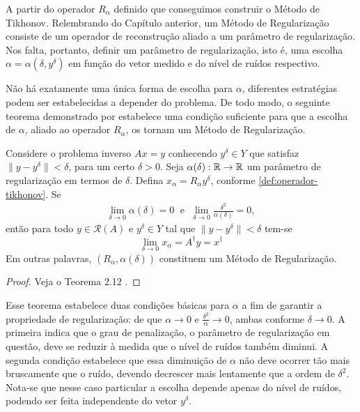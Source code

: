 A partir do operador $R_\alpha$ definido que conseguimos construir o Método de Tikhonov. Relembrando do Capítulo anterior, um Método de Regularização consiste de um operador de reconstrução aliado a um parâmetro de regularização. Nos falta, portanto, definir um parâmetro de regularização, isto é, uma escolha $\alpha = \alpha(\delta,y^\delta)$ em função do vetor medido e do nível de ruídos respectivo. 

Não há exatamente uma única forma de escolha para $\alpha$, diferentes estratégias podem ser estabelecidas a depender do problema. De todo modo, o seguinte teorema demonstrado por  estabelece uma condição suficiente para que a escolha de $\alpha$, aliado ao operador $R_\alpha$, os tornam um Método de Regularização. 

\begin{teo}
    Considere o problema inverso $Ax=y$ conhecendo $y^\delta \in Y$ que satisfaz $\|y-y^\delta\| < \delta$, para um certo $\delta > 0$. Seja $\alpha(\delta): \mathbb{R} \to \mathbb{R}$ um parâmetro de regularização em termos de $\delta$. Defina $x_\alpha = R_\alpha y^\delta$, conforme \ref{def:operador-tikhonov}.
    Se 
    \begin{align*}
    \lim_{\delta \to 0} \alpha(\delta) = 0  \; \text{ e } \;
    \lim_{\delta \to 0} \frac{\delta^2}{\alpha(\delta)} = 0,
    \end{align*}
    então para todo $y\in \mathcal R(A)$ e $y^\delta \in Y$ tal que $\|y-y^\delta\| < \delta$ tem-se
    \begin{equation*}
        \lim_{\delta \to 0} x_\alpha = A^\dag y = x^\dag
    \end{equation*}
    Em outras palavras, $(R_\alpha, \alpha(\delta))$ constituem um Método de Regularização.
\end{teo}
\begin{proof}
Veja o Teorema 2.12 \cite{kirsch}.
\end{proof}

Esse teorema estabelece duas condições básicas para $\alpha$ a fim de garantir a propriedade de regularização: de que $\alpha \to 0$ e $\frac{\delta^2}{\alpha} \to 0$, ambas conforme $\delta \to 0$. A primeira indica que o grau de penalização, o parâmetro de regularização em questão, deve se reduzir à medida que o nível de ruídos também diminui. A segunda condição estabelece que essa diminuição de $\alpha$ não deve ocorrer tão mais bruscamente que o ruído, devendo decrescer mais lentamente que a ordem de $\delta^2$. Nota-se que nesse caso particular a escolha depende apenas do nível de ruídos, podendo ser feita independente do vetor $y^\delta$.


